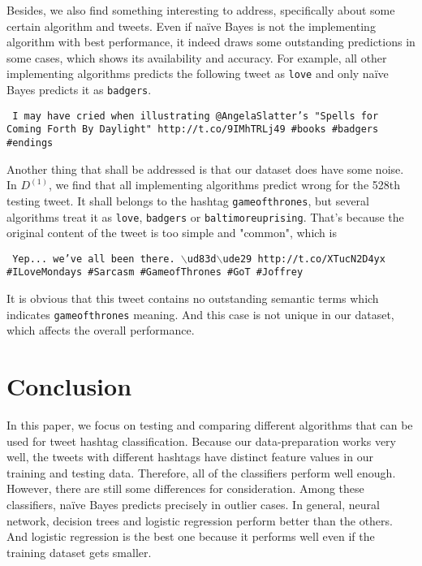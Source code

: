 \documentclass[letterpaper,11pt,twocolumn]{article}
\begin{document}
Besides, we also find something interesting to address, specifically about some certain algorithm and tweets. Even if na{\"i}ve Bayes is not the implementing algorithm with best performance, it indeed draws some outstanding predictions in some cases, which shows its availability and accuracy. For example, all other implementing algorithms predicts the following tweet as \texttt{love} and only na{\"i}ve Bayes predicts it as \texttt{badgers}.
\begin{framed}
\texttt{
I may have cried when illustrating @AngelaSlatter's "Spells for Coming Forth By Daylight" http://t.co/9IMhTRLj49 \#books \#badgers \#endings
}
\end{framed}
Another thing that shall be addressed is that our dataset does have some noise. In $D^{(1)}$, we find that all implementing algorithms predict wrong for the 528th testing tweet. It shall belongs to the hashtag \texttt{gameofthrones}, but several algorithms treat it as \texttt{love}, \texttt{badgers} or \texttt{baltimoreuprising}. That's because the original content of the tweet is too simple and "common", which is
\begin{framed}
\texttt{
Yep... we've all been there. $\backslash$ud83d$\backslash$ude29 http://t.co/XTucN2D4yx  \#ILoveMondays \#Sarcasm \#GameofThrones \#GoT \#Joffrey
}
\end{framed}
It is obvious that this tweet contains no outstanding semantic terms which indicates \texttt{gameofthrones} meaning. And this case is not unique in our dataset, which affects the overall performance.



\section{Conclusion}
\label{sec:conc}
In this paper, we focus on testing and comparing different algorithms that can be used for tweet hashtag classification. Because our data-preparation works very well, the tweets with different hashtags have distinct feature values in our training and testing data. Therefore, all of the classifiers perform well enough. However, there are still some differences for consideration. Among these classifiers, na{\"i}ve Bayes predicts precisely in outlier cases. In general, neural network, decision trees and logistic regression perform better than the others. And logistic regression is the best one because it performs well even if the training dataset gets smaller.

% 


\end{document}
